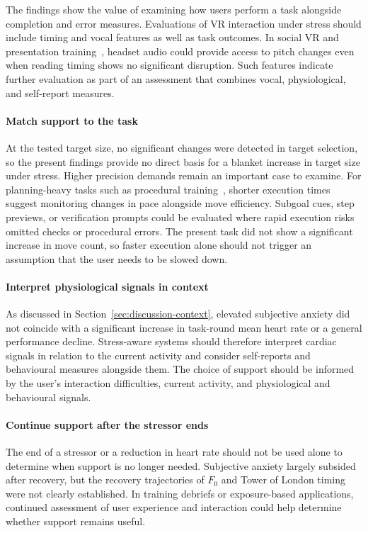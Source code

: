 The findings show the value of examining how users perform a task alongside completion and error measures. Evaluations of VR interaction under stress should include timing and vocal features as well as task outcomes. In social VR and presentation training~\citep{dillon2021real,pertaub2002experiment}, headset audio could provide access to pitch changes even when reading timing shows no significant disruption. Such features indicate further evaluation as part of an assessment that combines vocal, physiological, and self-report measures.

\paragraph{Match support to the task}

At the tested target size, no significant changes were detected in target selection, so the present findings provide no direct basis for a blanket increase in target size under stress. Higher precision demands remain an important case to examine. For planning-heavy tasks such as procedural training~\citep{zhang2026seconds,evangelista2025knowledge}, shorter execution times suggest monitoring changes in pace alongside move efficiency. Subgoal cues, step previews, or verification prompts could be evaluated where rapid execution risks omitted checks or procedural errors. The present task did not show a significant increase in move count, so faster execution alone should not trigger an assumption that the user needs to be slowed down.

\paragraph{Interpret physiological signals in context}

As discussed in Section~\ref{sec:discussion-context}, elevated subjective anxiety did not coincide with a significant increase in task-round mean heart rate or a general performance decline. Stress-aware systems should therefore interpret cardiac signals in relation to the current activity and consider self-reports and behavioural measures alongside them. The choice of support should be informed by the user's interaction difficulties, current activity, and physiological and behavioural signals.

\paragraph{Continue support after the stressor ends}
The end of a stressor or a reduction in heart rate should not be used alone to determine when support is no longer needed. Subjective anxiety largely subsided after recovery, but the recovery trajectories of \(F_0\) and Tower of London timing were not clearly established. In training debriefs or exposure-based applications, continued assessment of user experience and interaction could help determine whether support remains useful.

